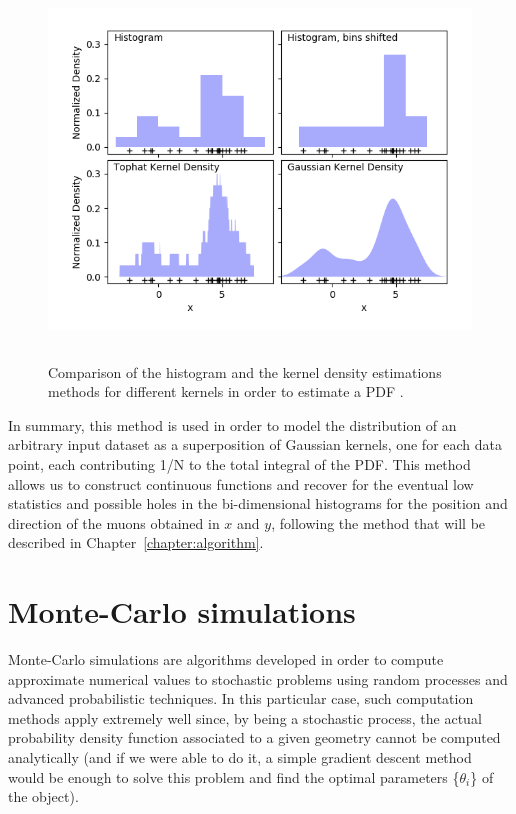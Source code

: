 \documentclass[a4paper, 11pt]{report}
\begin{document}
\begin{figure}[htbp]
\centering
\includegraphics[width=13cm, height=10cm]{figs/kernels.png}
\caption{Comparison of the histogram and the kernel density estimations methods for different kernels in order to estimate a PDF \cite{scikit}.}
\label{fig:KGR}
\end{figure}

In summary, this method is used in order to model the distribution of an arbitrary input dataset as a superposition of Gaussian kernels, one for each data point, each contributing 1/N to the total integral of the PDF. This method allows us to construct continuous functions and recover for the eventual low statistics and possible holes in the bi-dimensional histograms for the position and direction of the muons obtained in $x$ and $y$, following the method that will be described in Chapter~\ref{chapter:algorithm}.

\section{Monte-Carlo simulations} \label{sec:MC}

Monte-Carlo simulations are algorithms developed in order to compute approximate numerical values to stochastic problems using random processes and advanced probabilistic techniques. In this particular case, such computation methods apply extremely well since, by being a stochastic process, the actual probability density function associated to a given geometry cannot be computed analytically (and if we were able to do it, a simple gradient descent method would be enough to solve this problem and find the optimal parameters \{$\theta_i$\} of the object). 
\end{document}
